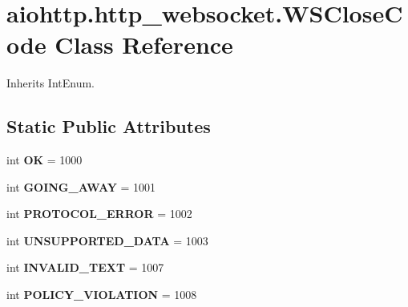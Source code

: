 \hypertarget{classaiohttp_1_1http__websocket_1_1_w_s_close_code}{}\section{aiohttp.\+http\+\_\+websocket.\+W\+S\+Close\+Code Class Reference}
\label{classaiohttp_1_1http__websocket_1_1_w_s_close_code}


Inherits Int\+Enum.

\subsection*{Static Public Attributes}
\begin{DoxyCompactItemize}
\item 
\mbox{\label{classaiohttp_1_1http__websocket_1_1_w_s_close_code_a087b477dee7e5f205a228e61fb83ce5a}} 
int {\bfseries OK} = 1000
\item 
\mbox{\label{classaiohttp_1_1http__websocket_1_1_w_s_close_code_a54056d17984f1bc37cbea9b6314cba4b}} 
int {\bfseries G\+O\+I\+N\+G\+\_\+\+A\+W\+AY} = 1001
\item 
\mbox{\label{classaiohttp_1_1http__websocket_1_1_w_s_close_code_aa18e900a46f891b3a8be76948e93499f}} 
int {\bfseries P\+R\+O\+T\+O\+C\+O\+L\+\_\+\+E\+R\+R\+OR} = 1002
\item 
\mbox{\label{classaiohttp_1_1http__websocket_1_1_w_s_close_code_a929eb5265e1503eb80781236c8c12108}} 
int {\bfseries U\+N\+S\+U\+P\+P\+O\+R\+T\+E\+D\+\_\+\+D\+A\+TA} = 1003
\item 
\mbox{\label{classaiohttp_1_1http__websocket_1_1_w_s_close_code_a31b5f444ef567a182d83b6660a7b0c93}} 
int {\bfseries I\+N\+V\+A\+L\+I\+D\+\_\+\+T\+E\+XT} = 1007
\item 
\mbox{\label{classaiohttp_1_1http__websocket_1_1_w_s_close_code_a9bcfe15f8d0ac2813d614c67048c40c9}} 
int {\bfseries P\+O\+L\+I\+C\+Y\+\_\+\+V\+I\+O\+L\+A\+T\+I\+ON} = 1008

\end{DoxyCompactItemize}

